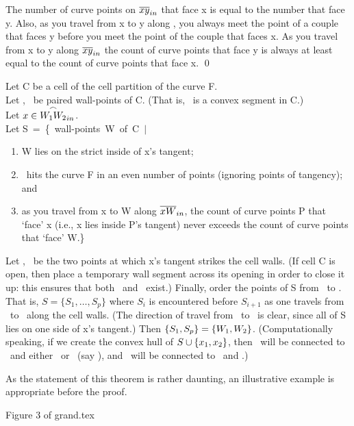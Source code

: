 \hence The number of curve points on $\mbox{$\overline{xy}$}_{in}$ that face
x is equal to the number that face y.
Also, as you travel from x to y along , 
you always meet the point of a couple that faces y before you meet the point
of the couple that faces x.
\hence As you travel from x to y along $\mbox{$\overline{xy}$}_{in}$
the count of curve
points that face y is always at least equal to the count of curve
points that face x.
\qed
\begin{theorem}\nopagebreak
\label{grandnonwall}
Let C be a cell of the cell partition of the curve F.\\
Let \wone, \wtwo\ be paired wall-points of C.
(That is, \arc{\ww}\ is a convex segment in C.)\\
Let $x \in \mbox{$\stackrel{\frown}{\mbox{$W_{1}W_{2}$}}$}_{in}$.\\
Let \mbox{S = \{ wall-points W of C $\mid$ }
\begin{enumerate}
	\item W lies on the strict inside of x's tangent;
	\item {}\ hits the curve F in an even number of points (ignoring
points of tangency); and
	\item as you travel from x to W along $\mbox{$\overline{xW}$}_{in}$,
the count of curve points P that `face' x (i.e., x lies inside P's
tangent) never exceeds the count of curve points that `face' W.\}
\end{enumerate}
Let \xone, \xtwo\ be the two points at which x's tangent strikes the cell 
walls.
(If cell C is open, then place a temporary wall segment across its opening in
order to close it up: this ensures that both \xone\ and \xtwo\ exist.)
Finally, order the points of S from \xone\ to \xtwo.
That is, $S = \{S_{1},\ldots,S_{p}\}$ where $S_{i}$ is encountered before
$S_{i+1}$ as one travels from \xone\ to \xtwo\ along the cell walls.
(The direction of travel from \xone\ to \xtwo\ is clear, since
all of S lies on
one side of x's tangent.)
Then $\{S_{1},S_{p}\} = \{\mbox{$W_{1}$},\mbox{$W_{2}$}\} $.
(Computationally speaking, if we create the convex hull of
$S \cup \{\mbox{$x_{1}$},\mbox{$x_{2}$}\}$, then \xone\ will be connected to \xtwo\ and either
\wone\ or \wtwo\ (say \wone), and \xtwo\ will be connected to \xone\ and
\wtwo.)
\end{theorem}
As the statement of this theorem is rather daunting, 
an illustrative example is appropriate before the proof.
\begin{center}
Figure 3 of grand.tex
\end{center}
\proof
